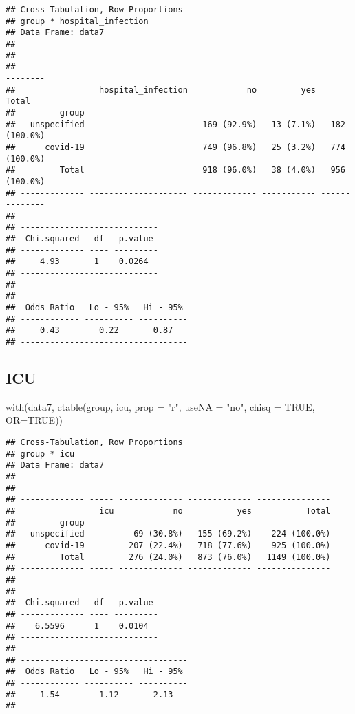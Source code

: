 \documentclass[
]{article}
\newenvironment{Shaded}{\begin{snugshade}}{\end{snugshade}}
\newcommand{\AttributeTok}[1]{\textcolor[rgb]{0.77,0.63,0.00}{#1}}
\newcommand{\ConstantTok}[1]{\textcolor[rgb]{0.00,0.00,0.00}{#1}}
\newcommand{\FunctionTok}[1]{\textcolor[rgb]{0.00,0.00,0.00}{#1}}
\newcommand{\NormalTok}[1]{#1}
\newcommand{\StringTok}[1]{\textcolor[rgb]{0.31,0.60,0.02}{#1}}
\begin{document}
\begin{verbatim}
## Cross-Tabulation, Row Proportions  
## group * hospital_infection  
## Data Frame: data7  
## 
## 
## ------------- -------------------- ------------- ----------- --------------
##                 hospital_infection            no         yes          Total
##         group                                                              
##   unspecified                        169 (92.9%)   13 (7.1%)   182 (100.0%)
##      covid-19                        749 (96.8%)   25 (3.2%)   774 (100.0%)
##         Total                        918 (96.0%)   38 (4.0%)   956 (100.0%)
## ------------- -------------------- ------------- ----------- --------------
## 
## ----------------------------
##  Chi.squared   df   p.value 
## ------------- ---- ---------
##     4.93       1    0.0264  
## ----------------------------
## 
## ----------------------------------
##  Odds Ratio   Lo - 95%   Hi - 95% 
## ------------ ---------- ----------
##     0.43        0.22       0.87   
## ----------------------------------
\end{verbatim}

\hypertarget{icu}{%
\subsection{ICU}\label{icu}}

\begin{Shaded}
\begin{Highlighting}[]
\FunctionTok{with}\NormalTok{(data7, }\FunctionTok{ctable}\NormalTok{(group, icu, }\AttributeTok{prop =} \StringTok{"r"}\NormalTok{, }\AttributeTok{useNA =} \StringTok{"no"}\NormalTok{, }\AttributeTok{chisq =} \ConstantTok{TRUE}\NormalTok{, }\AttributeTok{OR=}\ConstantTok{TRUE}\NormalTok{))}
\end{Highlighting}
\end{Shaded}

\begin{verbatim}
## Cross-Tabulation, Row Proportions  
## group * icu  
## Data Frame: data7  
## 
## 
## ------------- ----- ------------- ------------- ---------------
##                 icu            no           yes           Total
##         group                                                  
##   unspecified          69 (30.8%)   155 (69.2%)    224 (100.0%)
##      covid-19         207 (22.4%)   718 (77.6%)    925 (100.0%)
##         Total         276 (24.0%)   873 (76.0%)   1149 (100.0%)
## ------------- ----- ------------- ------------- ---------------
## 
## ----------------------------
##  Chi.squared   df   p.value 
## ------------- ---- ---------
##    6.5596      1    0.0104  
## ----------------------------
## 
## ----------------------------------
##  Odds Ratio   Lo - 95%   Hi - 95% 
## ------------ ---------- ----------
##     1.54        1.12       2.13   
## ----------------------------------
\end{verbatim}
\end{document}
